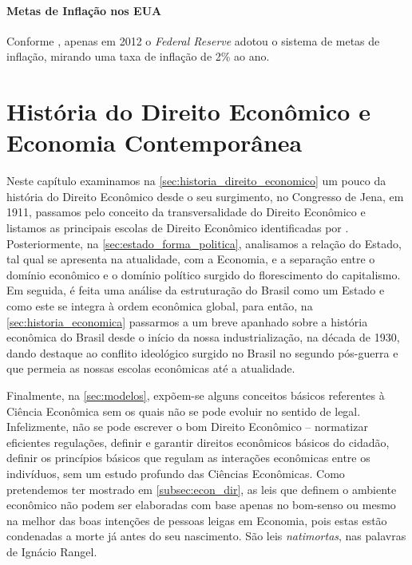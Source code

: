 \documentclass[
	10pt,				%
	openright,			%
	twoside,			%
	a5paper,			%
	english,			%
	french,				%
	spanish,			%
	brazil				%
	]{abntex2}
\begin{document}
\subsubsection{Metas de Inflação nos EUA}\label{subsubsec:IT_FED}

Conforme , apenas em 2012 o \emph{Federal Reserve}
adotou o sistema de metas de inflação, mirando uma taxa de inflação de
2\% ao ano.

\chapter{História do Direito Econômico e Economia
Contemporânea}\label{cap:2}

Neste capítulo examinamos na \autoref{sec:historia_direito_economico} um
pouco da história do Direito Econômico desde o seu surgimento, no
Congresso de Jena, em 1911, passamos pelo conceito da transversalidade
do Direito Econômico e listamos as principais escolas de Direito
Econômico identificadas por .
Posteriormente, na \autoref{sec:estado_forma_politica}, analisamos a
relação do Estado, tal qual se apresenta na atualidade, com a Economia,
e a separação entre o domínio econômico e o domínio político surgido do
florescimento do capitalismo. Em seguida, é feita uma análise da
estruturação do Brasil como um Estado e como este se integra à ordem
econômica global, para então, na \autoref{sec:historia_economica}
passarmos a um breve apanhado sobre a história econômica do Brasil desde
o início da nossa industrialização, na década de 1930, dando destaque ao
conflito ideológico surgido no Brasil no segundo pós-guerra e que
permeia as nossas escolas econômicas até a atualidade.

Finalmente, na \autoref{sec:modelos}, expõem-se alguns conceitos básicos
referentes à Ciência Econômica sem os quais não se pode evoluir no
sentido de legal. Infelizmente, não se pode escrever o bom Direito
Econômico -- normatizar eficientes regulações, definir e garantir
direitos econômicos básicos do cidadão, definir os princípios básicos
que regulam as interações econômicas entre os indivíduos, sem um estudo
profundo das Ciências Econômicas. Como pretendemos ter mostrado em
\autoref{subsec:econ_dir}, as leis que definem o ambiente econômico não
podem ser elaboradas com base apenas no bom-senso ou mesmo na melhor das
boas intenções de pessoas leigas em Economia, pois estas estão
condenadas a morte já antes do seu nascimento. São leis
\emph{natimortas}, nas palavras de Ignácio Rangel.
\end{document}
